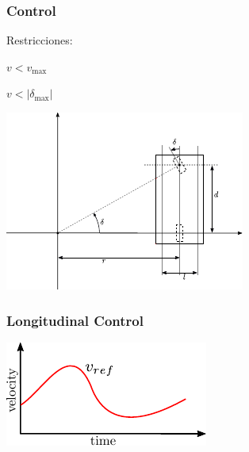 \begin{frame}
    \frametitle{Control}
    
    Restricciones:
    
    $v < v_{\max}$
    
    $v < |\delta_{\max}|$
    
    
    \begin{center}
        \includegraphics[width=0.6\columnwidth]{images/ackermann_kinematics.pdf}
    \end{center}
    
\end{frame}

\begin{frame}
    \frametitle{Longitudinal Control}
    
    \begin{center}
        \includegraphics[width=0.6\columnwidth]{images/longitudinal_control.pdf}
    \end{center}
    
    
\end{frame}


